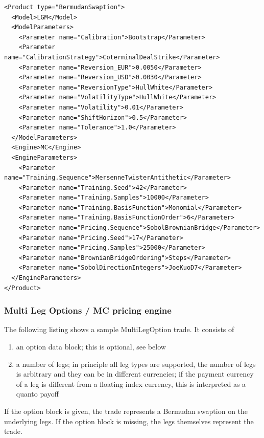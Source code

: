\documentclass[12pt, a4paper]{article}
\begin{document}
\begin{verbatim}
<Product type="BermudanSwaption">
  <Model>LGM</Model>
  <ModelParameters>
    <Parameter name="Calibration">Bootstrap</Parameter>
    <Parameter name="CalibrationStrategy">CoterminalDealStrike</Parameter>
    <Parameter name="Reversion_EUR">0.0050</Parameter>
    <Parameter name="Reversion_USD">0.0030</Parameter>
    <Parameter name="ReversionType">HullWhite</Parameter>
    <Parameter name="VolatilityType">HullWhite</Parameter>
    <Parameter name="Volatility">0.01</Parameter>
    <Parameter name="ShiftHorizon">0.5</Parameter>
    <Parameter name="Tolerance">1.0</Parameter>
  </ModelParameters>
  <Engine>MC</Engine>
  <EngineParameters>
    <Parameter name="Training.Sequence">MersenneTwisterAntithetic</Parameter>
    <Parameter name="Training.Seed">42</Parameter>
    <Parameter name="Training.Samples">10000</Parameter>
    <Parameter name="Training.BasisFunction">Monomial</Parameter>
    <Parameter name="Training.BasisFunctionOrder">6</Parameter>
    <Parameter name="Pricing.Sequence">SobolBrownianBridge</Parameter>
    <Parameter name="Pricing.Seed">17</Parameter>
    <Parameter name="Pricing.Samples">25000</Parameter>
    <Parameter name="BrownianBridgeOrdering">Steps</Parameter>
    <Parameter name="SobolDirectionIntegers">JoeKuoD7</Parameter>
  </EngineParameters>
</Product>
\end{verbatim}

\subsubsection*{Multi Leg Options / MC pricing engine}

The following listing shows a sample MultiLegOption trade. It consists of

\begin{enumerate}
\item an option data block; this is optional, see below
\item a number of legs; in principle all leg types are supported, the number of legs is arbitrary and they can be in
  different currencies; if the payment currency of a leg is different from a floating index currency, this is
  interpreted as a quanto payoff
\end{enumerate}

If the option block is given, the trade represents a Bermudan swaption on the underlying legs. If the option block is
missing, the legs themselves represent the trade.
\end{document}
